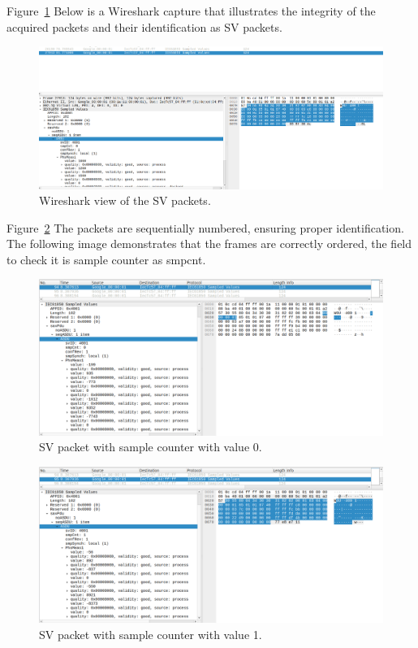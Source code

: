 Figure~\ref{fig:simple_sv} Below is a Wireshark capture that illustrates the integrity of the acquired packets and their identification as SV packets.

\begin{figure}[tbh]
	\centering
	\includegraphics[width=1.00\textwidth, keepaspectratio]{ch6/assets/simple_sv.png} %
	\caption{Wireshark view of the SV packets.}
	\label{fig:simple_sv}
\end{figure}
\FloatBarrier

Figure~\ref{fig:sv_seq_1} The packets are sequentially numbered, ensuring proper identification. The following image demonstrates that the frames are correctly ordered, the field to check it is sample counter as smpcnt.

\begin{figure}[tbh]
	\centering
	\includegraphics[width=1.00\textwidth, keepaspectratio]{ch6/assets/sv_seq_1.png} %
	\caption{SV packet with sample counter with value 0.}
	\label{fig:sv_seq_1}
\end{figure}
\FloatBarrier

\begin{figure}[tbh]
	\centering
	\includegraphics[width=1.00\textwidth, keepaspectratio]{ch6/assets/sv_seq_2.png} %
	\caption{SV packet with sample counter with value 1.}
	\label{fig:sv_seq_2}
\end{figure}
\FloatBarrier

